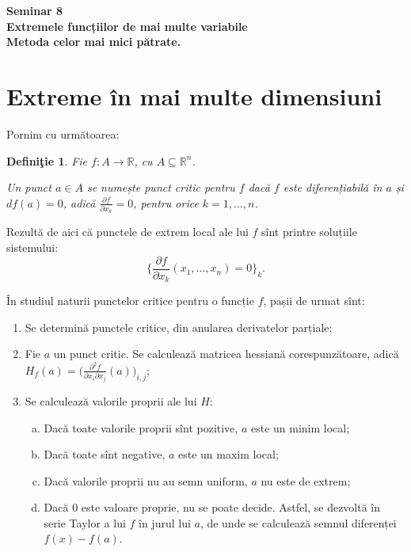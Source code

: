 \documentclass[11pt,a4paper]{article}
\newcommand\seq{\subseteq}
\newcommand\RR{\mathbb{R}}
\theoremstyle{dotless}
\theoremstyle{dotlessdr}
\newtheorem{definition}{Defini\c{t}ie}[section]
\begin{document}
\begin{center}
  {
    \large\textbf{
      Seminar 8 \\
      Extremele funcțiilor de mai multe variabile \\
      Metoda celor mai mici pătrate.
    }}
\end{center}

\vspace{1cm}

\section{Extreme în mai multe dimensiuni}
\label{sec:extreme}

Pornim cu următoarea:

\begin{definition}\label{def:p-critic}
  Fie $f : A \to \RR$, cu $A \seq \RR^n$.

  Un punct $a \in A$ se numește \emph{punct critic} pentru $f$ dacă $f$ este
  diferențiabilă în $a$ și $df(a) = 0$, adică $\frac{\partial f}{\partial x_k} = 0$,
  pentru orice $k = 1, \dots, n$.
\end{definition}

Rezultă de aici că punctele de extrem local ale lui $f$ sînt printre soluțiile
sistemului:
\[
  \Big\{ \frac{\partial f}{\partial x_k}(x_1, \dots, x_n) = 0 \Big\}_k.
\]

În studiul naturii punctelor critice pentru o funcție $f$, pașii de urmat sînt:
\begin{enumerate}[(1)]
\item Se determină punctele critice, din anularea derivatelor parțiale;
\item Fie $a$ un punct critic. Se calculează matricea hessiană corespunzătoare,
  adică $H_f(a) = \Big( \frac{\partial^2 f}{\partial x_i \partial x_j} (a) \Big)_{i,j}$;
\item Se calculează valorile proprii ale lui $H$:
  \begin{enumerate}[(a)]
  \item Dacă toate valorile proprii sînt pozitive, $a$ este un minim local;
  \item Dacă toate sînt negative, $a$ este un maxim local;
  \item Dacă valorile proprii nu au semn uniform, $a$ nu este de extrem;
  \item Dacă 0 este valoare proprie, nu se poate decide. Astfel, se dezvoltă
    în serie Taylor a lui $f$ în jurul lui $a$, de unde se calculează semnul
    diferenței $f(x) - f(a)$.
  \end{enumerate}
\end{enumerate}
\end{document}
